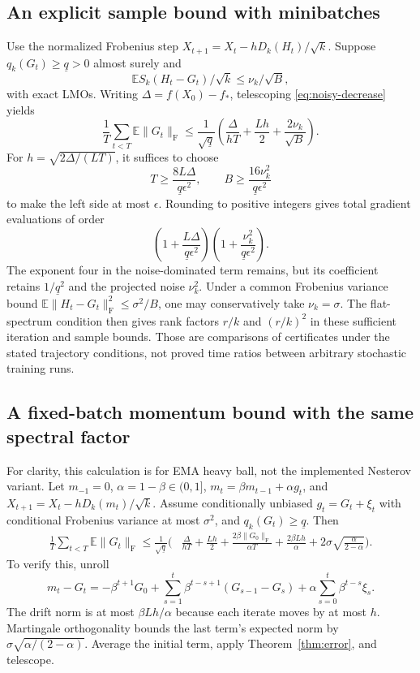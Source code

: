 \documentclass[11pt]{article}
\newcommand{\E}{\mathbb E}
\newcommand{\F}[1]{\lVert #1\rVert_{\mathrm F}}
\begin{document}
\subsection{An explicit sample bound with minibatches}

Use the normalized Frobenius step $X_{t+1}=X_t-hD_k(H_t)/\sqrt k$.
Suppose $q_k(G_t)\geq\underline q>0$ almost surely and
\[
 \E S_k(H_t-G_t)/\sqrt k\leq\nu_k/\sqrt B,
\]
with exact LMOs. Writing $\Delta=f(X_0)-f_*$, telescoping
\eqref{eq:noisy-decrease} yields
\begin{equation}\label{eq:batch-bound}
 \frac1T\sum_{t<T}\E\F{G_t}\leq
 \frac{1}{\sqrt{\underline q}}
 \left(\frac{\Delta}{hT}+\frac{Lh}{2}
       +\frac{2\nu_k}{\sqrt B}\right).
\end{equation}
For $h=\sqrt{2\Delta/(LT)}$, it suffices to choose
\[
 T\geq\frac{8L\Delta}{\underline q\epsilon^2},\qquad
 B\geq\frac{16\nu_k^2}{\underline q\epsilon^2}
\]
to make the left side at most $\epsilon$. Rounding to positive integers
gives total gradient evaluations of order
\[
 \left(1+\frac{L\Delta}{\underline q\epsilon^2}\right)
 \left(1+\frac{\nu_k^2}{\underline q\epsilon^2}\right).
\]
The exponent four in the noise-dominated term remains, but its coefficient
retains $1/\underline q^2$ and the projected noise $\nu_k^2$.
Under a common Frobenius variance bound $\E\F{H_t-G_t}^2\leq\sigma^2/B$,
one may conservatively take $\nu_k=\sigma$. The flat-spectrum condition
then gives rank factors $r/k$ and $(r/k)^2$ in these sufficient iteration
and sample bounds. Those are comparisons of certificates under the
stated trajectory conditions, not proved time ratios between arbitrary
stochastic training runs.

\subsection{A fixed-batch momentum bound with the same spectral factor}

For clarity, this calculation is for EMA heavy ball, not the implemented
Nesterov variant. Let $m_{-1}=0$, $\alpha=1-\beta\in(0,1]$,
$m_t=\beta m_{t-1}+\alpha g_t$, and
$X_{t+1}=X_t-hD_k(m_t)/\sqrt k$. Assume conditionally unbiased
$g_t=G_t+\xi_t$ with conditional Frobenius variance at most $\sigma^2$,
and $q_k(G_t)\geq\underline q$.
Then
\begin{equation}\label{eq:ema-bound}
\begin{split}
 \frac1T\sum_{t<T}\E\F{G_t}\leq\frac1{\sqrt{\underline q}}
 \bigg(&\frac{\Delta}{hT}+\frac{Lh}{2}
 +\frac{2\beta\F{G_0}}{\alpha T}
 +\frac{2\beta Lh}{\alpha}
 +2\sigma\sqrt{\frac{\alpha}{2-\alpha}}\bigg).
\end{split}
\end{equation}
To verify this, unroll
\[
 m_t-G_t=-\beta^{t+1}G_0+
 \sum_{s=1}^t\beta^{t-s+1}(G_{s-1}-G_s)
 +\alpha\sum_{s=0}^t\beta^{t-s}\xi_s.
\]
The drift norm is at most $\beta Lh/\alpha$ because each iterate moves
by at most $h$. Martingale orthogonality bounds the last term's expected
norm by $\sigma\sqrt{\alpha/(2-\alpha)}$. Average the initial term,
apply Theorem~\ref{thm:error}, and telescope.
\end{document}
